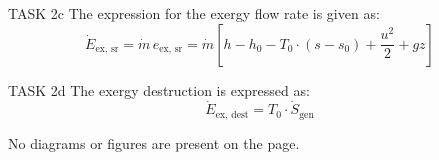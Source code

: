 TASK 2c  
The expression for the exergy flow rate is given as:  
\[
\dot{E}_{\text{ex, sr}} = \dot{m} \, e_{\text{ex, sr}} = \dot{m} \left[ h - h_0 - T_0 \cdot (s - s_0) + \frac{u^2}{2} + gz \right]
\]  

TASK 2d  
The exergy destruction is expressed as:  
\[
\dot{E}_{\text{ex, dest}} = T_0 \cdot \dot{S}_{\text{gen}}
\]  

No diagrams or figures are present on the page.